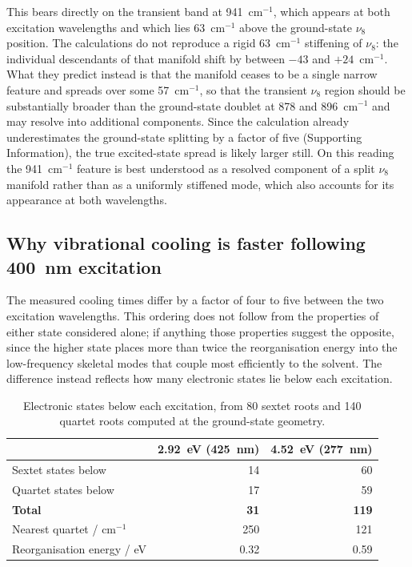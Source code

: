 \documentclass[11pt,a4paper]{article}
\newcommand{\wn}{\ensuremath{\mathrm{cm^{-1}}}}
\begin{document}
This bears directly on the transient band at 941~\wn{}, which appears at both
excitation wavelengths and which lies 63~\wn{} above the ground-state $\nu_8$
position. The calculations do not reproduce a rigid 63~\wn{} stiffening of
$\nu_8$: the individual descendants of that manifold shift by between $-43$
and $+24$~\wn{}. What they predict instead is that the manifold ceases to be a
single narrow feature and spreads over some 57~\wn{}, so that the transient
$\nu_8$ region should be substantially broader than the ground-state doublet at
878 and 896~\wn{} and may resolve into additional components. Since the
calculation already underestimates the ground-state splitting by a factor of
five (Supporting Information), the true excited-state spread is likely larger
still. On this reading the 941~\wn{} feature is best understood as a resolved
component of a split $\nu_8$ manifold rather than as a uniformly stiffened
mode, which also accounts for its appearance at both wavelengths.

\subsection{Why vibrational cooling is faster following 400~nm excitation}

The measured cooling times differ by a factor of four to five between the two
excitation wavelengths. This ordering does not follow from the properties of
either state considered alone; if anything those properties suggest the
opposite, since the higher state places more than twice the reorganisation
energy into the low-frequency skeletal modes that couple most efficiently to
the solvent. The difference instead reflects how many electronic states lie
below each excitation.

\begin{table}[htbp]
\centering
\caption{Electronic states below each excitation, from 80 sextet roots and 140
quartet roots computed at the ground-state geometry.}
\begin{tabular}{l r r}
\toprule
 & 2.92~eV (425~nm) & 4.52~eV (277~nm) \\
\midrule
Sextet states below              & 14 & 60 \\
Quartet states below             & 17 & 59 \\
\textbf{Total}                   & \textbf{31} & \textbf{119} \\
Nearest quartet / \wn{}          & 250 & 121 \\
Reorganisation energy / eV       & 0.32 & 0.59 \\
\bottomrule
\end{tabular}
\end{table}
\end{document}
